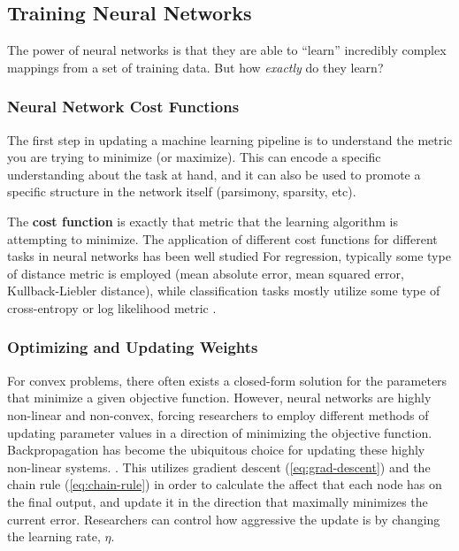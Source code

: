 \subsection{Training Neural Networks}

The power of neural networks is that they are able to ``learn'' incredibly complex mappings from a set of training data. But how \emph{exactly} do they learn?

\subsubsection{Neural Network Cost Functions}

The first step in updating a machine learning pipeline is to understand the metric you are trying to minimize (or maximize). This can encode a specific understanding about the task at hand, and it can also be used to promote a specific structure in the network itself (parsimony, sparsity, etc).

The \textbf{cost function} is exactly that metric that the learning algorithm is attempting to minimize. The application of different cost functions for different tasks in neural networks has been well studied For regression, typically some type of distance metric is employed (mean absolute error, mean squared error, Kullback-Liebler distance), while classification tasks mostly utilize some type of cross-entropy or log likelihood metric \cite{paszkePyTorchImperativeStyle2019}.

\subsubsection{Optimizing and Updating Weights}

For convex problems, there often exists a closed-form solution for the parameters that minimize a given objective function. However, neural networks are highly non-linear and non-convex, forcing researchers to employ different methods of updating parameter values in a direction of minimizing the objective function. Backpropagation has become the ubiquitous choice for updating these highly non-linear systems. \cite{rumelhartLearningRepresentationsBackpropagating1986}. This utilizes gradient descent (\cref{eq:grad-descent}) and the chain rule (\cref{eq:chain-rule}) in order to calculate the affect that each node has on the final output, and update it in the direction that maximally minimizes the current error. Researchers can control how aggressive the update is by changing the learning rate, $\eta$.

